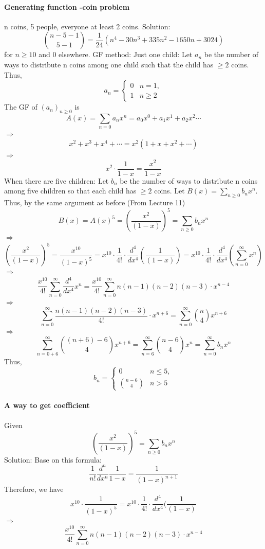 \documentclass{article}
\begin{document}
\paragraph{Generating function -coin problem}
n coins, 5 people, everyone at least 2 coins.\newline
Solution:\newline
$$\binom{n-5-1}{5-1}=\frac{1}{24}(n^4-30n^3+335n^2-1650n+3024)$$ for $n\ge 10$ and 0 elsewhere.\newline
GF method:\newline
Just one child: \newline
Let $a_n$ be the number of ways to distribute n coins among one child such that the child has $\ge 2$ coins.\newline
Thus,$$a_n=\begin{cases}0&\text{$n=1$},\\1&\text{$n\ge 2$}\end{cases}$$
The GF of $(a_n)_{n\ge 0}$ is $$
A(x)=\sum_{n=0}a_nx^n=a_0x^0+a_1x^1+a_2x^2\cdots$$
$\Longrightarrow$
$$x^2+x^3+x^4+\cdots=x^2(1+x+x^2+\cdots)$$
$\Longrightarrow$
$$x^2\cdot \frac{1}{1-x}=\frac{x^2}{1-x}$$
When there are five children:\newline
Let $b_n$ be the number of ways to distribute n coins among five children so that each child has $\ge 2$ coins.\newline
Let $B(x)=\sum_{n\ge 0}b_nx^n$.\newline
Thus, by the same argument as before (From Lecture 11)
$$B(x)=A(x)^5=(\frac{x^2}{(1-x)})^5=\sum_{n\ge 0}b_nx^n$$
$\Longrightarrow$
$$(\frac{x^2}{(1-x)})^5=\frac{x^{10}}{(1-x)^5}=x^{10}\cdot \frac{1}{4!}\cdot \frac{d^4}{dx^4}(\frac{1}{(1-x)})=x^{10}\cdot \frac{1}{4!}\cdot \frac{d^4}{dx^4}(\sum_{n=0}^{\infty}x^n)$$
$\Longrightarrow$
$$\frac{x^{10}}{4!}\sum_{n=0}^{\infty}\frac{d^4}{dx^4}x^n=\frac{x^{10}}{4!}\sum_{n=0}^{\infty}n(n-1)(n-2)(n-3)\cdot x^{n-4}$$
$\Longrightarrow$
$$\sum_{n=0}^{\infty}\frac{n(n-1)(n-2)(n-3)}{4!}\cdot x^{n+6}=\sum_{n=0}^{\infty}\binom{n}{4}x^{n+6}$$
$\Longrightarrow$
$$\sum_{n=0+6}^{\infty}\binom{(n+6)-6}{4}x^{n+6}=\sum_{n=6}^{\infty}\binom{n-6}{4}x^n=\sum_{n=0}^{\infty}b_nx^n$$
Thus,
$$b_n=\begin{cases}
    0&\text{$n\leq 5$},\\{\binom{n-6}{4}}&\text{$n > 5$}
\end{cases}$$
\paragraph{A way to get coefficient}
Given$$(\frac{x^2}{(1-x)})^5=\sum_{n\ge 0}b_nx^n$$
Solution:\newline
Base on this formula:
$$\frac{1}{n!}\frac{d^n}{dx^n}\frac{1}{1-x}=\frac{1}{(1-x)^{n+1}}$$
Therefore, we have
$$x{^{10}}\cdot \frac{1}{(1-x)^5}=x^{10}\cdot \frac{1}{4!} \cdot \frac{d^4}{dx^4}(\frac{1}{(1-x)}$$
$\Longrightarrow$
$$$$
$$$$
$$\frac{x^{10}}{4!}\sum_{n=0}^{\infty}n(n-1)(n-2)(n-3)\cdot x^{n-4}$$
\end{document}
